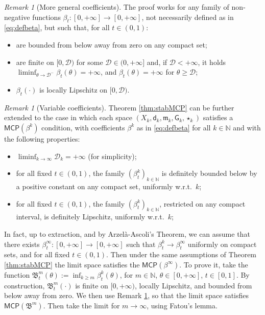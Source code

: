 \documentclass[11pt,a4paper]{article}
\theoremstyle{plain}
\theoremstyle{definition}
\theoremstyle{remark}
\newtheorem{remark}[theorem]{Remark}
\numberwithin{equation}{section}
\newcommand{\N}{\mathbb{N}} %
\newcommand{\MCP}{\mathsf{MCP}}
\newcommand{\cD}{\mathcal{D}}
\newcommand{\mm}{\mathfrak m}
\newcommand{\sfd}{\mathsf d}
\newcommand{\sfG}{\mathsf G}
\begin{document}
\begin{remark}[More general coefficients]\label{rmk:moregenfunctions}
The proof works for any family of non-negative functions $\beta_t : [0,+\infty] \to [0,+\infty]$, not necessarily defined as in \eqref{eq:defbeta}, but such that, for all $t\in (0,1)$:
\begin{itemize}
\item are bounded from below away from zero on any compact set;
\item are finite on $[0,\cD)$ for some $\cD \in (0,+\infty]$ and, if $\cD<+\infty$, it holds $\liminf_{\theta \to \cD^-}\beta_t(\theta) = +\infty$, and $\beta_t(\theta) = +\infty$ for $\theta \geq \cD$;
\item $\beta_t(\cdot)$ is locally Lipschitz on $[0,\cD)$.
\end{itemize}
\end{remark}
\begin{remark}[Variable coefficients]
Theorem \ref{thm:stabMCP} can be further extended to the case in which each space $(X_k,\sfd_k,\mm_k,\sfG_k,\star_k)$ satisfies a $\MCP(\beta^k)$ condition, with coefficients $\beta^k$ as in \eqref{eq:defbeta} for all $k\in \N$ and with the following properties: 
\begin{itemize}
\item $\liminf_{k\to\infty}\cD_k=+\infty$ (for simplicity);
\item for all fixed $t\in (0,1)$, the family $(\beta_t^k)_{k\in\N}$ is  definitely bounded below by a positive constant on any compact set, uniformly w.r.t.\ $k$;
\item for all fixed $t\in (0,1)$, the family $(\beta_t^k)_{k\in\N}$, restricted on any compact interval, is definitely Lipschitz, uniformly w.r.t.\ $k$;
\end{itemize}
In fact, up to extraction, and by Arzelà-Ascoli's Theorem, we can assume that there exists $\beta_t^\infty : [0,+\infty]\to [0,+\infty]$ such that $\beta_t^k \to \beta_t^\infty$ uniformly on compact sets, and for all fixed $t\in (0,1)$. Then under the same assumptions of Theorem \ref{thm:stabMCP} the limit space satisfies the $\MCP(\beta^\infty)$. To prove it, take the function $\mathfrak{B}_t^m(\theta):=\inf_{k\geq m} \beta_t^k(\theta)$, for $m\in \N$, $\theta \in [0,+\infty]$, $t\in [0,1]$. By construction, $\mathfrak{B}_t^m(\cdot)$ is finite on $[0,+\infty)$, locally Lipschitz, and bounded from below away from zero. We then use Remark \ref{rmk:moregenfunctions}, so that the limit space satisfies $\MCP(\mathfrak{B}^m)$. Then take the limit for $m\to\infty$, using Fatou's lemma.
\end{remark}
\end{document}
